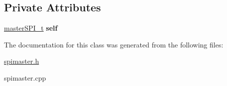 \subsection*{Private Attributes}
\begin{DoxyCompactItemize}
\item 
\mbox{\label{classMasterSPI_ad92299e347f8e51309afc226daff5677}} 
\hyperlink{structmasterSPI__t}{master\+S\+P\+I\+\_\+t} {\bfseries self}
\end{DoxyCompactItemize}


The documentation for this class was generated from the following files\+:\begin{DoxyCompactItemize}
\item 
\hyperlink{spimaster_8h}{spimaster.\+h}\item 
spimaster.\+cpp\end{DoxyCompactItemize}
